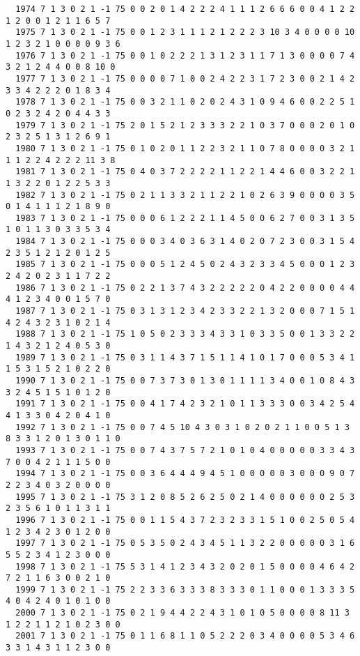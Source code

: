 \begin{landscape}
{\begin{verbatim}
  1974 7 1 3 0 2 1 -1 75 0 0 2 0 1 4 2 2 2 4 1 1 1 2 6 6 6 0 0 4 1 2 2 1 2 0 0 1 2 1 1 6 5 7
  1975 7 1 3 0 2 1 -1 75 0 0 1 2 3 1 1 1 2 1 2 2 2 3 10 3 4 0 0 0 0 10 1 2 3 2 1 0 0 0 0 9 3 6
  1976 7 1 3 0 2 1 -1 75 0 0 1 0 2 2 2 1 3 1 2 3 1 1 7 1 3 0 0 0 0 7 4 3 2 1 2 4 4 0 0 8 10 0
  1977 7 1 3 0 2 1 -1 75 0 0 0 0 7 1 0 0 2 4 2 2 3 1 7 2 3 0 0 2 1 4 2 3 3 4 2 2 2 0 1 8 3 4
  1978 7 1 3 0 2 1 -1 75 0 0 3 2 1 1 0 2 0 2 4 3 1 0 9 4 6 0 0 2 2 5 1 0 2 3 2 4 2 0 4 4 3 3
  1979 7 1 3 0 2 1 -1 75 2 0 1 5 2 1 2 3 3 3 2 2 1 0 3 7 0 0 0 2 0 1 0 2 3 2 5 1 3 1 2 6 9 1
  1980 7 1 3 0 2 1 -1 75 0 1 0 2 0 1 1 2 2 3 2 1 1 0 7 8 0 0 0 0 3 2 1 1 1 2 2 4 2 2 2 11 3 8
  1981 7 1 3 0 2 1 -1 75 0 4 0 3 7 2 2 2 2 1 1 2 2 1 4 4 6 0 0 3 2 2 1 1 3 2 2 0 1 2 2 5 3 3
  1982 7 1 3 0 2 1 -1 75 0 2 1 1 3 3 2 1 1 2 2 1 0 2 6 3 9 0 0 0 0 3 5 0 1 4 1 1 1 2 1 8 9 0
  1983 7 1 3 0 2 1 -1 75 0 0 0 6 1 2 2 2 1 1 4 5 0 0 6 2 7 0 0 3 1 3 5 1 0 1 1 3 0 3 3 5 3 4
  1984 7 1 3 0 2 1 -1 75 0 0 0 3 4 0 3 6 3 1 4 0 2 0 7 2 3 0 0 3 1 5 4 2 3 5 1 2 1 2 0 1 2 5
  1985 7 1 3 0 2 1 -1 75 0 0 0 5 1 2 4 5 0 2 4 3 2 3 3 4 5 0 0 0 1 2 3 2 4 2 0 2 3 1 1 7 2 2
  1986 7 1 3 0 2 1 -1 75 0 2 2 1 3 7 4 3 2 2 2 2 2 0 4 2 2 0 0 0 0 4 4 4 1 2 3 4 0 0 1 5 7 0
  1987 7 1 3 0 2 1 -1 75 0 3 1 3 1 2 3 4 2 3 3 2 2 1 3 2 0 0 0 7 1 5 1 4 2 4 3 2 3 1 0 2 1 4
  1988 7 1 3 0 2 1 -1 75 1 0 5 0 2 3 3 3 4 3 3 1 0 3 3 5 0 0 1 3 3 2 2 1 4 3 2 1 2 4 0 5 3 0
  1989 7 1 3 0 2 1 -1 75 0 3 1 1 4 3 7 1 5 1 1 4 1 0 1 7 0 0 0 5 3 4 1 1 5 3 1 5 2 1 0 2 2 0
  1990 7 1 3 0 2 1 -1 75 0 0 7 3 7 3 0 1 3 0 1 1 1 1 3 4 0 0 1 0 8 4 3 3 2 4 5 1 5 1 0 1 2 0
  1991 7 1 3 0 2 1 -1 75 0 0 4 1 7 4 2 3 2 1 0 1 1 3 3 3 0 0 3 4 2 5 4 4 1 3 3 0 4 2 0 4 1 0
  1992 7 1 3 0 2 1 -1 75 0 0 7 4 5 10 4 3 0 3 1 0 2 0 2 1 1 0 0 5 1 3 8 3 3 1 2 0 1 3 0 1 1 0
  1993 7 1 3 0 2 1 -1 75 0 0 7 4 3 7 5 7 2 1 0 1 0 4 0 0 0 0 0 3 3 4 3 7 0 0 4 2 1 1 1 5 0 0
  1994 7 1 3 0 2 1 -1 75 0 0 3 6 4 4 4 9 4 5 1 0 0 0 0 0 3 0 0 0 9 0 7 2 2 3 4 0 3 2 0 0 0 0
  1995 7 1 3 0 2 1 -1 75 3 1 2 0 8 5 2 6 2 5 0 2 1 4 0 0 0 0 0 0 2 5 3 2 3 5 6 1 0 1 1 3 1 1
  1996 7 1 3 0 2 1 -1 75 0 0 1 1 5 4 3 7 2 3 2 3 3 1 5 1 0 0 2 5 0 5 4 1 2 3 4 2 3 0 1 2 0 0
  1997 7 1 3 0 2 1 -1 75 0 5 3 5 0 2 4 3 4 5 1 1 3 2 2 0 0 0 0 0 3 1 6 5 5 2 3 4 1 2 3 0 0 0
  1998 7 1 3 0 2 1 -1 75 5 3 1 4 1 2 3 4 3 2 0 2 0 1 5 0 0 0 0 4 6 4 2 7 2 1 1 6 3 0 0 2 1 0
  1999 7 1 3 0 2 1 -1 75 2 2 3 3 6 3 3 3 8 3 3 3 0 1 1 0 0 0 1 3 3 3 5 4 0 4 2 4 0 1 0 1 0 0
  2000 7 1 3 0 2 1 -1 75 0 2 1 9 4 4 2 2 4 3 1 0 1 0 5 0 0 0 0 8 11 3 1 2 2 1 1 2 1 0 2 3 0 0
  2001 7 1 3 0 2 1 -1 75 0 1 1 6 8 1 1 0 5 2 2 2 0 3 4 0 0 0 0 5 3 4 6 3 3 1 4 3 1 1 2 3 0 0

\end{verbatim}}
\end{landscape}
